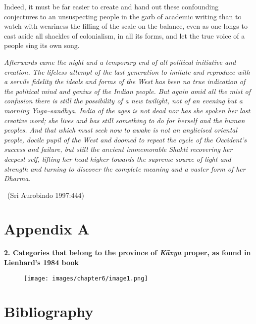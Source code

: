 Indeed, it must be far easier to create and hand out these confounding conjectures to an unsuspecting people in the garb of academic writing than to watch with weariness the filling of the scale on the balance, even as one longs to cast aside all shackles of colonialism, in all its forms, and let the true voice of a people sing its own song.

\begin{myquote}
\textit{Afterwards came the night and a temporary end of all political initiative and creation. The lifeless attempt of the last generation to imitate and reproduce with a servile fidelity the ideals and forms of the West has been no true indication of the political mind and genius of the Indian people. But again amid all the mist of confusion there is still the possibility of a new twilight, not of an evening but a morning Yuga–sandhya. India of the ages is not dead nor has she spoken her last creative word; she lives and has still something to do for herself and the human peoples. And that which must seek now to awake is not an anglicised oriental people, docile pupil of the West and doomed to repeat the cycle of the Occident’s success and failure, but still the ancient immemorable Shakti recovering her deepest self, lifting her head higher towards the supreme source of light and strength and turning to discover the complete meaning and a vaster form of her Dharma.} 

~\hfill (Sri Aurobindo 1997:444)
\end{myquote}


\section*{Appendix A}

\textbf{2. Categories that belong to the province of \textit{Kāvya} proper, as found in Lienhard’s 1984 book}

\begin{figure}
\texttt{[image: images/chapter6/image1.png]}
\end{figure}


\section*{Bibliography}

